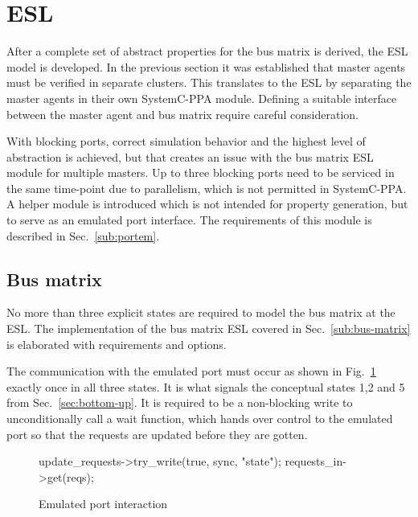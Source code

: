 \section{ESL}
After a complete set of abstract properties for the bus matrix is derived, the ESL model is developed. In the previous section it was established that master agents must be verified in separate clusters. This translates to the ESL by separating the master agents in their own SystemC-PPA module. Defining a suitable interface between the master agent and bus matrix require careful consideration. \par
With blocking ports, correct simulation behavior and the highest level of abstraction is achieved, but that creates an issue with the bus matrix ESL module for multiple masters. Up to three blocking ports need to be serviced in the same time-point due to parallelism, which is not permitted in SystemC-PPA. A helper module is introduced which is not intended for property generation, but to serve as an emulated port interface. The requirements of this module is described in Sec.~\ref{sub:portem}.

\subsection{Bus matrix}
\label{sub:bus-matrix-design}
No more than three explicit states are required to model the bus matrix at the ESL. The implementation of the bus matrix ESL covered in Sec.~\ref{sub:bus-matrix} is elaborated with requirements and options. \par
The communication with the emulated port must occur as shown in Fig.~\ref{fig:em-port-code} exactly once in all three states. It is what signals the conceptual states 1,2 and 5 from Sec.~\ref{sec:bottom-up}. It is required to be a non-blocking write to unconditionally call a wait function, which hands over control to the emulated port so that the requests are updated before they are gotten. 
\begin{figure}[h!]
\begin{C++}
update_requests->try_write(true, sync, "state");  
requests_in->get(reqs); 
\end{C++}
\caption{Emulated port interaction}
\label{fig:em-port-code}
\end{figure}


